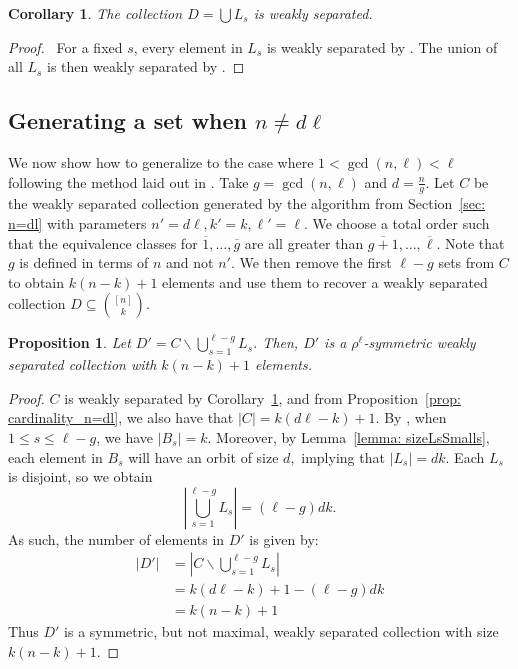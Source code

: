 \documentclass[11pt]{amsart}
\theoremstyle{plain}
\newtheorem{proposition}[theorem]{Proposition}
\newtheorem{corollary}[theorem]{Corollary}
\theoremstyle{definition}
\begin{document}
\begin{corollary}\label{Cor:weakSeperation}
The collection $D=\bigcup L_s$ is weakly separated.
\end{corollary}
\begin{proof}\
    For a fixed $s$, every element in $L_s$ is weakly separated by . The union of all $L_s$ is then weakly separated by .
\end{proof}
\subsection{Generating a set when $n\neq d\ell$}\label{sub: not_divide} 

We now show how to generalize to the case where $1< \gcd(n, \ell) < \ell$ following the method laid out in \cite[Section 5]{PasqTZ2019}. Take $g=\gcd(n, \ell)$ and $d=\frac{n}{g}$. Let $C$ be the weakly separated collection generated by the algorithm from Section~\ref{sec: n=dl} with parameters $n'=d\ell, k'=k, \ell'=\ell$. We choose a total order such that the equivalence classes for $\overline{1}, \dots,\overline{g}$ are all greater than $ \overline{g+1},\dots, \overline{\ell}$. Note that $g$ is defined in terms of $n$ and not $n'$. We then remove the first $\ell-g$ sets from $C$ to obtain $k(n-k)+1$ elements and use them to recover a weakly separated collection $D\subseteq {[n]\choose k}$. 


\begin{proposition}\label{Prop:genConstruct}
Let $D'=C \backslash \bigcup \limits_{s=1}^{\ell-g} L_s$. Then, $D'$ is a $\rho^\ell$-symmetric weakly separated collection with $k(n-k)+1$ elements. 
\end{proposition} 
\begin{proof}
$C$ is weakly separated by Corollary~\ref{Cor:weakSeperation}, and from Proposition~\ref{prop: cardinality_n=dl}, we also have that $|C|=k(d\ell-k)+1$. By , when $1\leq s \leq \ell-g$, we have $|B_s|=k$. Moreover, by Lemma~\ref{lemma: sizeLsSmalls}, each element in $B_s$ will have an orbit of size $d,$ implying that $|L_s|=dk$. Each $L_s$ is disjoint, so we obtain $$\left|\bigcup \limits_{s=1}^{\ell-g} L_s\right|=(\ell-g)dk.$$
As such, the number of elements in $D'$ is given by:
\begin{align*}
    |D'|&=\left|C\backslash\bigcup \limits_{s=1}^{\ell-g} L_s\right|\\
    &=k(d\ell-k)+1-(\ell-g)dk\\
    &=k(n-k)+1
\end{align*}
Thus $D'$ is a symmetric, but not maximal, weakly separated collection with size $k(n-k)+1$. 
\end{proof}
\end{document}
